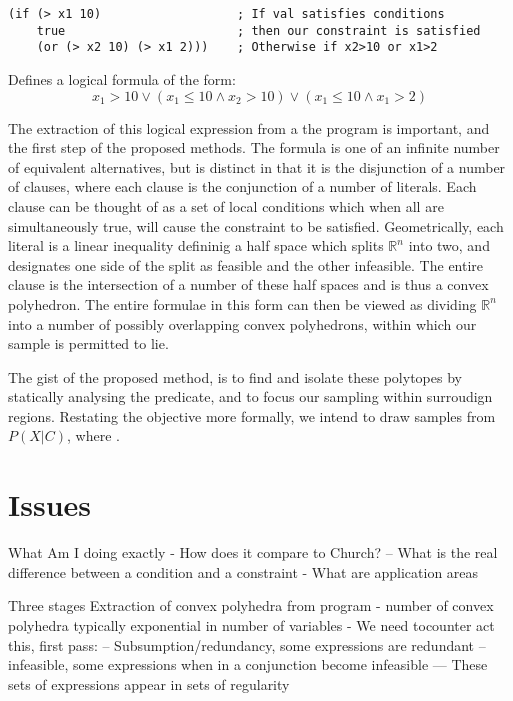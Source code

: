 \begin{verbatim}
(if (> x1 10)                   ; If val satisfies conditions
    true                        ; then our constraint is satisfied
    (or (> x2 10) (> x1 2)))    ; Otherwise if x2>10 or x1>2
\end{verbatim}

Defines a logical formula of the form:
\begin{equation}
x_1 > 10 \lor (x_1 \le 10 \land x_2 > 10) \lor (x_1 \le 10 \land x_1 > 2)
\end{equation}

The extraction of this logical expression from a the program is important, and the first step of the proposed methods.
The formula is one of an infinite number of equivalent alternatives, but is distinct in that it is the disjunction of a number of clauses, where each clause is the conjunction of a number of literals.
Each clause can be thought of as a set of local conditions which when all are simultaneously true, will cause the constraint to be satisfied.
Geometrically, each literal is a linear inequality defininig a half space which splits $\mathbb{R}^n$ into two, and designates one side of the split as feasible and the other infeasible.
The entire clause is the intersection of a number of these half spaces and is thus a convex polyhedron.
The entire formulae in this form can then be viewed as dividing $\mathbb{R}^n$ into a number of possibly overlapping convex polyhedrons, within which our sample is permitted to lie.

The gist of the proposed method, is to find and isolate these polytopes by statically analysing the predicate, and to focus our sampling within surroudign regions.
Restating the objective more formally, we intend to draw samples from $P(X \vert C)$, where   .

\section{Issues}
What Am I doing exactly
- How does it compare to Church?
-- What is  the real difference between a condition and a constraint
- What are application areas

Three stages
Extraction of convex polyhedra from program
- number of convex polyhedra typically exponential in number of variables
- We need tocounter act this, first pass:
-- Subsumption/redundancy, some expressions are redundant
-- infeasible, some expressions when in a conjunction become infeasible
--- These sets of expressions appear in sets of regularity


